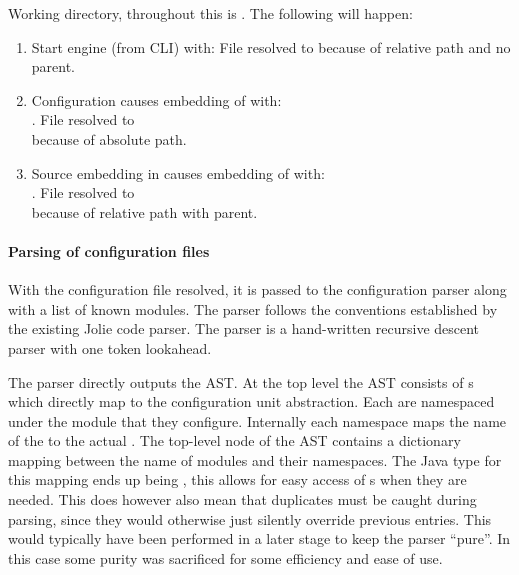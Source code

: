 Working directory, throughout this is .  The following will happen:

\begin{enumerate}

\item Start engine (from CLI) with: 
File resolved to  because of relative path and no parent.

\item Configuration causes embedding of  with:
\\. File resolved to
\\ because of absolute path.

\item Source embedding in  causes embedding of 
with: \\. File resolved
to \\ because of relative path with parent.

\end{enumerate}

\paragraph{Parsing of configuration files}

With the configuration file resolved, it is passed to the configuration parser
along with a list of known modules. The parser follows the conventions
established by the existing Jolie code parser. The parser is a hand-written
recursive descent parser with one token lookahead.

The parser directly outputs the AST. At the top level the AST consists of
s which directly map to the configuration unit abstraction. Each
 are namespaced under the module that they configure. Internally
each namespace maps the name of the  to the actual
. The top-level node of the AST contains a dictionary mapping
between the name of modules and their namespaces. The Java type for this
mapping ends up being , this allows for
easy access of s when they are needed. This does however also
mean that duplicates must be caught during parsing, since they would otherwise
just silently override previous entries. This would typically have been
performed in a later stage to keep the parser ``pure''. In this case some
purity was sacrificed for some efficiency and ease of use.

